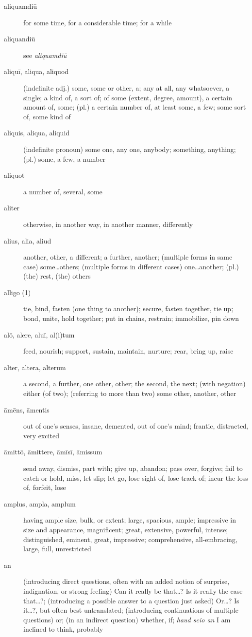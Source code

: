 \begin{description}
    \item[aliquamdiū] for some time, for a considerable time; for a while
    \item[aliquandiū] see \textit{aliquamdiū}
    \item[aliquī, aliqua, aliquod] \marginnote{*}(indefinite adj.) some, some or other, a; any at all, any whatsoever, a single; a kind of, a sort of; of some (extent, degree, amount), a certain amount of, some; (pl.) a certain number of, at least some, a few; some sort of, some kind of
    \item[aliquis, aliqua, aliquid] \marginnote{*}(indefinite pronoun) some one, any one, anybody; something, anything; (pl.) some, a few, a number
    \item[aliquot] a number of, several, some
    \item[aliter] \marginnote{*}otherwise, in another way, in another manner, differently
    \item[alius, alia, aliud] \marginnote{*}another, other, a different; a further, another; (multiple forms in same case) some\dots others; (multiple forms in different cases) one\dots another; (pl.) (the) rest, (the) others
    \item[alligō (1)] tie, bind, fasten (one thing to another); secure, fasten together, tie up; bond, unite, hold together; put in chains, restrain; immobilize, pin down
    \item[alō, alere, aluī, al(i)tum] \marginnote{*}feed, nourish; support, sustain, maintain, nurture; rear, bring up, raise
    \item[alter, altera, alterum] \marginnote{*}a second, a further, one other, other; the second, the next; (with negation) either (of two); (referring to more than two) some other, another, other
    \item[āmēns, āmentis] out of one's senses, insane, demented, out of one's mind; frantic, distracted, very excited
    \item[āmittō, āmittere, āmīsī, āmissum] \marginnote{*}send away, dismiss, part with; give up, abandon; pass over, forgive; fail to catch or hold, miss, let slip; let go, lose sight of, lose track of; incur the loss of, forfeit, lose
    \item[amplus, ampla, amplum] \marginnote{*}having ample size, bulk, or extent; large, spacious, ample; impressive in size and appearance, magnificent; great, extensive, powerful, intense; distinguished, eminent, great, impressive; comprehensive, all-embracing, large, full, unrestricted
    \item[an] \marginnote{*}(introducing direct questions, often with an added notion of surprise, indignation, or strong feeling) Can it really be that\dots ? Is it really the case that\dots ?; (introducing a possible answer to a question just asked) Or\dots? Is it\dots?, but often best untranslated; (introducing continuations of multiple questions) or; (in an indirect question) whether, if; \textit{haud scio an} I am inclined to think, probably

\end{description}
